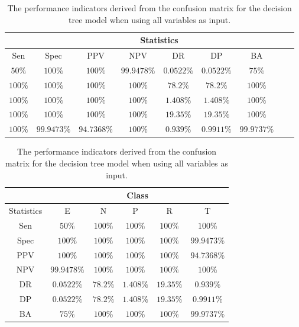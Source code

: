 \begin{table}[!ht]
	\centering
	\begin{tabular}{|c|c|c|c|c|c|c|c|c|}
		\hline
		 & \multicolumn{7}{c|}{Statistics} \\ \hline
		Sen & Spec & PPV & NPV & DR & DP & BA \\ \hline
		$50\%$ & $100\%$ & $100\%$ & $99.9478\%$ & $0.0522\%$ & $0.0522\%$ & $75\%$ \\ \hline
		$100\%$ & $100\%$ & $100\%$ & $100\%$ & $78.2\%$ & $78.2\%$ & $100\%$ \\ \hline
		$100\%$ & $100\%$ & $100\%$ & $100\%$ & $1.408\%$ & $1.408\%$ & $100\%$ \\ \hline
		$100\%$ & $100\%$ & $100\%$ & $100\%$ & $19.35\%$ & $19.35\%$ & $100\%$ \\ \hline
		$100\%$ & $99.9473\%$ & $94.7368\%$ & $100\%$ & $0.939\%$ & $0.9911\%$ & $99.9737\%$ \\ \hline
	\end{tabular}
	\caption{The performance indicators derived from the confusion matrix for the decision tree model when using all variables as input.}
	\label{tab:cs:all:C5.0}
\end{table}

\begin{table}[!ht]
	\centering
	\begin{tabular}{|c|c|c|c|c|c|}
		\hline
		 & \multicolumn{5}{c|}{Class} \\ \hline
		Statistics & E & N & P & R & T \\ \hline
		Sen & $50\%$ & $100\%$ & $100\%$ & $100\%$ & $100\%$ \\ \hline
		Spec & $100\%$ & $100\%$ & $100\%$ & $100\%$ & $99.9473\%$ \\ \hline
		PPV & $100\%$ & $100\%$ & $100\%$ & $100\%$ & $94.7368\%$ \\ \hline
		NPV & $99.9478\%$ & $100\%$ & $100\%$ & $100\%$ & $100\%$ \\ \hline
		DR & $0.0522\%$ & $78.2\%$ & $1.408\%$ & $19.35\%$ & $0.939\%$ \\ \hline
		DP & $0.0522\%$ & $78.2\%$ & $1.408\%$ & $19.35\%$ & $0.9911\%$ \\ \hline
		BA & $75\%$ & $100\%$ & $100\%$ & $100\%$ & $99.9737\%$ \\ \hline
	\end{tabular}
	\caption{The performance indicators derived from the confusion matrix for the decision tree model when using all variables as input.}
	\label{tab:cs:reverse:all:C5.0}
\end{table}

